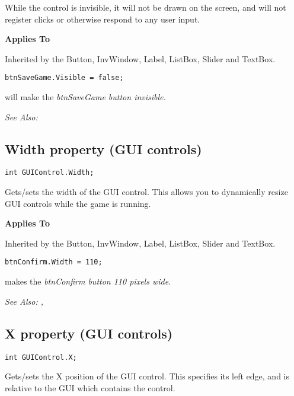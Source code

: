 While the control is invisible, it will not be drawn on the screen, and will not register
clicks or otherwise respond to any user input.

\bf{Applies To}

Inherited by the Button, InvWindow, Label, ListBox, Slider and TextBox.

\begin{verbatim}
btnSaveGame.Visible = false;
\end{verbatim}
will make the \it{btnSaveGame} button invisible.

\it{See Also:} 


\subsection{Width property (GUI controls)}\label{GUIControl.Width}%

\begin{verbatim}
int GUIControl.Width;
\end{verbatim}
Gets/sets the width of the GUI control.  This allows you to dynamically
resize GUI controls while the game is running.

\bf{Applies To}

Inherited by the Button, InvWindow, Label, ListBox, Slider and TextBox.

\begin{verbatim}
btnConfirm.Width = 110;
\end{verbatim}
makes the \it{btnConfirm} button 110 pixels wide.

\it{See Also:} ,


\subsection{X property (GUI controls)}\label{GUIControl.X}%

\begin{verbatim}
int GUIControl.X;
\end{verbatim}
Gets/sets the X position of the GUI control. This specifies its left edge, and is
relative to the GUI which contains the control.

